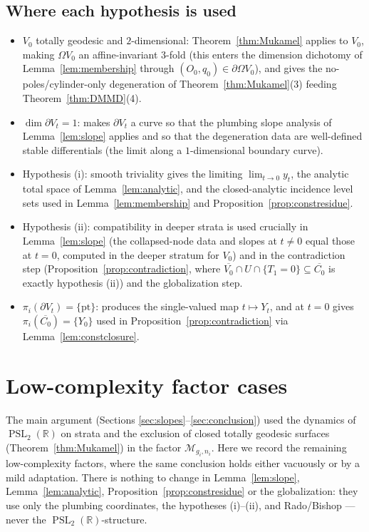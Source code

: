 \documentclass[11pt]{article}
\newcommand{\R}{\mathbb{R}}
\newcommand{\M}{\mathcal{M}}
\DeclareMathOperator{\PSL}{PSL}
\theoremstyle{definition}
\theoremstyle{remark}
\begin{document}
\subsection{Where each hypothesis is used}
\begin{itemize}[leftmargin=1.8em]
\item $V_0$ totally geodesic and $2$-dimensional:
Theorem~\ref{thm:Mukamel} applies to $V_0$, making $\Omega V_0$ an
affine-invariant $3$-fold (this enters the dimension dichotomy of
Lemma~\ref{lem:membership} through $(O_0,q_0) \in \partial\Omega V_0$), and
gives the no-poles/cylinder-only degeneration of
Theorem~\ref{thm:Mukamel}(3) feeding Theorem~\ref{thm:DMMD}(4).
\item $\dim \partial V_t = 1$: makes $\partial V_t$ a curve so that the
plumbing slope analysis of Lemma~\ref{lem:slope} applies and so that the
degeneration data are well-defined stable differentials
(the limit along a $1$-dimensional boundary curve).
\item Hypothesis (i): smooth triviality gives the limiting
$\lim_{t\to0} y_t$, the analytic total space of Lemma~\ref{lem:analytic},
and the closed-analytic incidence level sets used in
Lemma~\ref{lem:membership} and Proposition~\ref{prop:constresidue}.
\item Hypothesis (ii): compatibility in deeper strata is used crucially in
Lemma~\ref{lem:slope} (the collapsed-node data and slopes at $t \ne 0$
equal those at $t=0$, computed in the deeper stratum for $V_0$) and in the
contradiction step (Proposition~\ref{prop:contradiction}, where
$\overline{V_0}\cap U\cap\{T_1=0\} \subseteq \overline{C_0}$ is exactly
hypothesis (ii)) and the globalization step.
\item $\pi_i(\partial V_t) = \{\mathrm{pt}\}$: produces the single-valued
map $t \mapsto Y_t$, and at $t=0$ gives
$\pi_i(\overline{C_0}) = \{Y_0\}$ used in
Proposition~\ref{prop:contradiction} via Lemma~\ref{lem:constclosure}.
\end{itemize}

\appendix

\section{Low-complexity factor cases}\label{sec:lowcomplexity}

The main argument (Sections \ref{sec:slopes}--\ref{sec:conclusion})
used the dynamics of $\PSL_2(\R)$ on strata and the exclusion of closed
totally geodesic surfaces (Theorem~\ref{thm:Mukamel}) in the factor
$\M_{g_i,n_i}$. Here we record the remaining low-complexity factors,
where the same conclusion holds either vacuously or by a mild
adaptation. There is nothing to change in
Lemma~\ref{lem:slope}, Lemma~\ref{lem:analytic},
Proposition~\ref{prop:constresidue} or the globalization: they use only
the plumbing coordinates, the hypotheses (i)--(ii), and Rado/Bishop ---
never the $\PSL_2(\R)$-structure.
\end{document}
